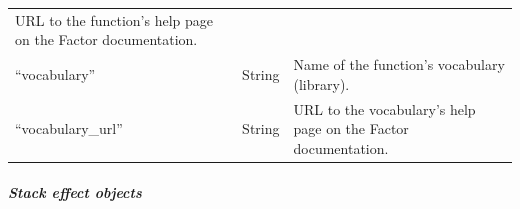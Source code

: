 \documentclass[
]{article}
\begin{document}
\begin{longtable}[]{@{}lll@{}}
\begin{minipage}[t]{0.64\columnwidth}
URL to the function's help page on the Factor documentation.\strut
\end{minipage}\tabularnewline
\begin{minipage}[t]{0.13\columnwidth}\raggedright
``vocabulary''\strut
\end{minipage} & \begin{minipage}[t]{0.14\columnwidth}\raggedright
String\strut
\end{minipage} & \begin{minipage}[t]{0.64\columnwidth}\raggedright
Name of the function's vocabulary (library).\strut
\end{minipage}\tabularnewline
\begin{minipage}[t]{0.13\columnwidth}\raggedright
``vocabulary\_url''\strut
\end{minipage} & \begin{minipage}[t]{0.14\columnwidth}\raggedright
String\strut
\end{minipage} & \begin{minipage}[t]{0.64\columnwidth}\raggedright
URL to the vocabulary's help page on the Factor documentation.\strut
\end{minipage}\tabularnewline
\bottomrule
\end{longtable}

\hypertarget{stack-effect-objects}{%
\subparagraph{Stack effect objects}\label{stack-effect-objects}}
\end{document}
